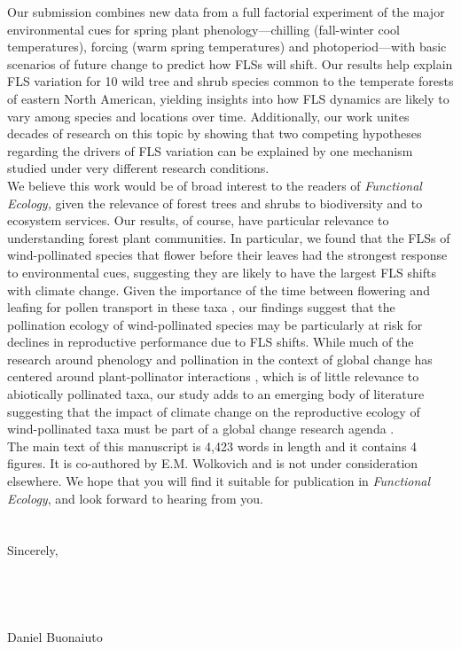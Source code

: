 \documentclass[11.75 pt]{article}\usepackage[]{graphicx}\usepackage[]{color}
\begin{document}
\noindent Our submission combines new data from a full factorial experiment of the major environmental cues for spring plant phenology---chilling (fall-winter cool temperatures), forcing (warm spring temperatures) and photoperiod---with basic scenarios of future change to predict how FLSs will shift. Our results help explain FLS variation for 10 wild tree and shrub species common to the temperate forests of eastern North American, yielding insights into how FLS dynamics are likely to vary among species and locations over time. Additionally, our work unites decades of research on this topic by showing that two competing hypotheses regarding the drivers of FLS variation can be explained by one mechanism studied under very different research conditions. \\

\noindent We believe this work would be of broad interest to the readers of \textit{Functional Ecology,} given the relevance of forest trees and shrubs to biodiversity and to ecosystem services. Our results, of course, have particular relevance to understanding forest plant communities. In particular, we found that the FLSs of wind-pollinated species that flower before their leaves had the strongest response to environmental cues, suggesting they are likely to have the largest FLS shifts with climate change. Given the importance of the time between flowering and leafing for pollen transport in these taxa \citep{Rathcke_1985}, our findings suggest that the pollination ecology of wind-pollinated species may be particularly at risk for declines in reproductive performance due to FLS shifts. While much of the research around phenology and pollination in the context of global change has centered around plant-pollinator interactions \citep{Settele:2016aa}, which is of little relevance to abiotically pollinated taxa, our study adds to an emerging body of literature suggesting that the impact of climate change on the reproductive ecology of wind-pollinated taxa must be part of a global change research agenda \citep{Kling:2020aa}.\\

\noindent The main text of this manuscript is 4,423 words in length and it contains 4 figures. It is co-authored by E.M. Wolkovich and is not under consideration elsewhere. We hope that you will find it suitable for publication in \textit{Functional Ecology}, and look forward to hearing from you.\\\\ %
\\Sincerely,\\\\\\\\\\

\noindent Daniel Buonaiuto\\


 
\end{document}

